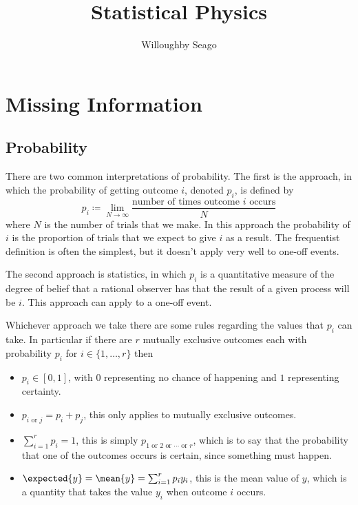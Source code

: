 \documentclass[fleqn]{NotesClass}
\title{Statistical Physics}
\author{Willoughby Seago}
\date{}
\begin{document}
    \frontmatter
    \titlepage
    \innertitlepage{} 
    \tableofcontents
    \mainmatter
    
    \chapter{Missing Information}
    \section{Probability}
    There are two common interpretations of probability.
    The first is the  approach, in which the probability of getting outcome \(i\), denoted \(p_i\), is defined by
    \begin{equation}
        p_i \coloneqq \lim_{N \to \infty} \frac{\text{number of times outcome \(i\) occurs}}{N}
    \end{equation}
    where \(N\) is the number of trials that we make.
    In this approach the probability of \(i\) is the proportion of trials that we expect to give \(i\) as a result.
    The frequentist definition is often the simplest, but it doesn't apply very well to one-off events.
    
    The second approach is  statistics, in which \(p_i\) is a quantitative measure of the degree of belief that a rational observer has that the result of a given process will be \(i\).
    This approach can apply to a one-off event.
    
    Whichever approach we take there are some rules regarding the values that \(p_i\) can take.
    In particular if there are \(r\) mutually exclusive outcomes each with probability \(p_i\) for \(i \in \{1, \dotsc, r\}\) then
    \begin{itemize}
        \item \(p_i \in [0, 1]\), with \(0\) representing no chance of happening and \(1\) representing certainty.
        \item \(p_{i\text{ or } j} = p_i + p_j\), this only applies to mutually exclusive outcomes.
        \item \(\sum_{i=1}^{r} p_i = 1\), this is simply \(p_{1 \text{ or } 2 \text{ or } \dotsb \text{ or } r}\), which is to say that the probability that one of the outcomes occurs is certain, since something must happen.
        \item \(\expected{y} = \mean{y} = \sum_{i=1}^{r} p_iy_i\), this is the mean value of \(y\), which is a quantity that takes the value \(y_i\) when outcome \(i\) occurs.
    \end{itemize}
    
\end{document}
